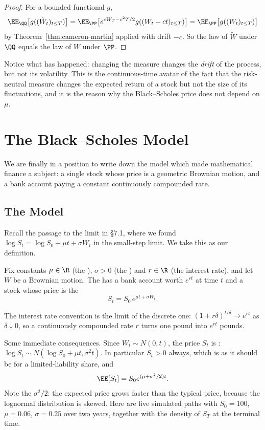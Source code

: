 \begin{proof}
	For a bounded functional $g$,
	$$
	\EE_\QQ\big[g((\tilde W_t)_{t\leq T})\big] = \EE_\PP\big[e^{cW_T-c^2T/2}g((W_t - ct)_{t\leq T})\big] = \EE_\PP\big[g((W_t)_{t\leq T})\big]
	$$
	by Theorem~\ref{thm:cameron-martin} applied with drift $-c$. So the law of $\tilde W$ under $\QQ$ equals the law of $W$ under $\PP$.
\end{proof}

Notice what has happened: changing the measure changes the \emph{drift} of the process, but not its volatility. This is the continuous-time avatar of the fact that the risk-neutral measure changes the expected return of a stock but not the size of its fluctuations, and it is the reason why the Black--Scholes price does not depend on $\mu$.

\section{The Black--Scholes Model}

We are finally in a position to write down the model which made mathematical finance a subject: a single stock whose price is a geometric Brownian motion, and a bank account paying a constant continuously compounded rate.

\subsection{The Model}

Recall the passage to the limit in \S7.1, where we found $\log S_t = \log S_0 + \mu t + \sigma W_t$ in the small-step limit. We take this as our definition.

\begin{definition}
	Fix constants $\mu \in \R$ (the ), $\sigma>0$ (the ) and $r \in \R$ (the interest rate), and let $W$ be a Brownian motion. The  has a bank account worth $e^{rt}$ at time $t$ and a stock whose price is the 
	$$
	S_t = S_0\,e^{\mu t + \sigma W_t}.
	$$
\end{definition}

The interest rate convention is the limit of the discrete one: $(1+r\delta)^{t/\delta}\to e^{rt}$ as $\delta \downarrow 0$, so a continuously compounded rate $r$ turns one pound into $e^{rt}$ pounds.

Some immediate consequences. Since $W_t\sim N(0,t)$, the price $S_t$ is : $\log S_t \sim N(\log S_0 + \mu t, \sigma^2 t)$. In particular $S_t>0$ always, which is as it should be for a limited-liability share, and
$$
\EE[S_t] = S_0e^{(\mu+\sigma^2/2)t}.
$$
Note the $\sigma^2/2$: the expected price grows faster than the typical price, because the lognormal distribution is skewed. Here are five simulated paths with $S_0 = 100$, $\mu = 0.06$, $\sigma = 0.25$ over two years, together with the density of $S_T$ at the terminal time.

